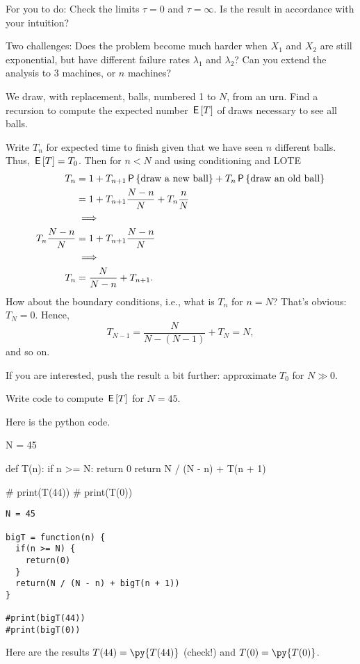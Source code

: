 \begin{exercise}
\begin{solution}
For you to do: Check the limits $\tau=0$ and $\tau=\infty$. Is the result in accordance with your intuition?

Two challenges: Does the problem become much harder when $X_{1}$ and $X_{2}$ are still exponential, but have different failure rates $\lambda_1$ and $\lambda_{2}$? Can you extend the analysis to 3 machines, or $n$ machines?

\end{solution}
\end{exercise}

\begin{exercise}
We draw, with replacement, balls, numbered 1 to $N$, from an urn.
Find a recursion to compute the expected number $\,\mathsf{E}\left[T\right]$ of draws necessary to see all balls.
\begin{solution}
Write $T_{n}$ for expected time to finish given that we have seen $n$ different balls. Thus, $\,\mathsf{E}\left[T\right] = T_{0}$.
Then for $n< N$ and using conditioning and LOTE
\begin{align}
\label{eq:28}
T_n
&= 1
+T_{n+1} \P{\text{draw a new ball}}
+T_{n} \P{\text{draw an old ball}}  \\
&= 1
+T_{n+1} \frac{N-n}{N}
+T_{n} \frac{n}{N} \\
&\implies\\
T_n \frac{N-n}{N} &= 1 +T_{n+1} \frac{N-n}{N} \\
&\implies \\
T_n &= \frac{N}{N-n}  +T_{n+1}.
\end{align}
How about the boundary conditions, i.e., what is $T_{n}$ for $n=N$?
That's obvious: $T_{N} = 0$. Hence,
\begin{equation}
\label{eq:28}
T_{N-1} = \frac{N}{N-(N-1)} + T_{N} = N,
\end{equation}
and so on.

If you are interested,  push the result a bit further: approximate $T_{0}$ for $N\gg 0$.
\end{solution}
\end{exercise}


\begin{exercise}
Write code to compute $\,\mathsf{E}\left[T\right]$ for $N=45$.
\begin{solution}
Here is the python code.

\begin{pyblock}
N = 45


def T(n):
    if n >= N:
        return 0
    return N / (N - n) + T(n + 1)

# print(T(44))
# print(T(0))
\end{pyblock}
\begin{verbatim}
N = 45

bigT = function(n) {
  if(n >= N) {
    return(0)
  }
  return(N / (N - n) + bigT(n + 1))
}

#print(bigT(44))
#print(bigT(0))
\end{verbatim}
Here are the results $T(44) = \py{T(44)}$ (check!) and $T(0) = \py{T(0)}$.
\end{solution}
\end{exercise}

